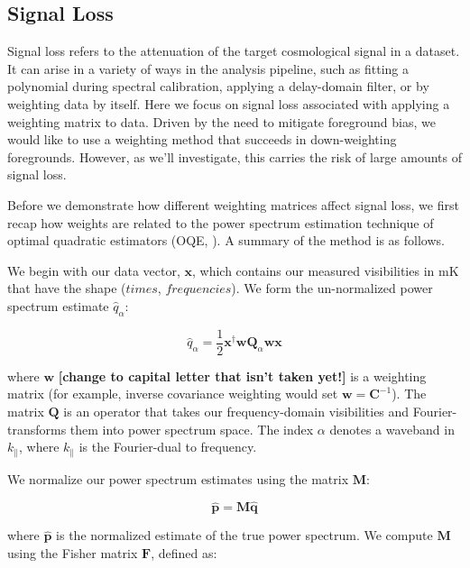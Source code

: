 \documentclass[preprint2,numberedappendix,tighten,twocolappendix]{aastex6}  %
\newcommand{\cc}[1]{{\color{purple} \textbf{[#1]}}}
\begin{document}
\subsection{Signal Loss}
\label{sec:SiglossOverview}

Signal loss refers to the attenuation of the target cosmological signal in a dataset. It can arise in a variety of ways in the analysis pipeline, such as fitting a polynomial during spectral calibration, applying a delay-domain filter, or by weighting data by itself. Here we focus on signal loss associated with applying a weighting matrix to data. Driven by the need to mitigate foreground bias, we would like to use a weighting method that succeeds in down-weighting foregrounds. However, as we'll investigate, this carries the risk of large amounts of signal loss. 

Before we demonstrate how different weighting matrices affect signal loss, we first recap how weights are related to the power spectrum estimation technique of optimal quadratic estimators (OQE, \citealt{liu_et_al2014b}). A summary of the method is as follows. 

We begin with our data vector, $\textbf{x}$, which contains our measured visibilities in mK that have the shape ($times$, $frequencies$). We form the un-normalized power spectrum estimate $\hat{q}_{\alpha}$:

\begin{equation}
\label{eq:qhat}
\hat{q}_{\alpha} = \frac{1}{2}\textbf{x}^{\dagger}\textbf{w}\textbf{Q}_{\alpha}\textbf{w}\textbf{x}
\end{equation}

where $\textbf{w}$ \cc{change to capital letter that isn't taken yet!} is a weighting matrix (for example, inverse covariance weighting would set $\textbf{w} = \textbf{C}^{-1}$). The matrix $\textbf{Q}$ is an operator that takes our frequency-domain visibilities and Fourier-transforms them into power spectrum space. The index $\alpha$ denotes a waveband in $k_{\parallel}$, where $k_{\parallel}$ is the Fourier-dual to frequency.

We normalize our power spectrum estimates using the matrix $\textbf{M}$:

\begin{equation}
\hat{\textbf{p}} = \textbf{M}\hat{\textbf{q}}
\end{equation}

where $\hat{\textbf{p}}$ is the normalized estimate of the true power spectrum. We compute $\textbf{M}$ using the Fisher matrix $\textbf{F}$, defined as:
\end{document}
